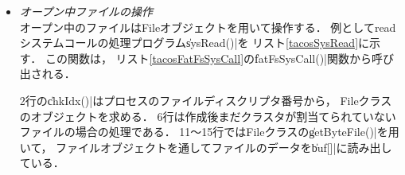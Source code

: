 \begin{itemize}
  2行はクライアントプロセスのPCB中に，
  ファイルディスクリプタを記録する場所を確保している\footnote{
    プロセス終了時にファイルを自動的にクローズるために，
    プロセス（PCB）に記録を残す必要がある．}．
  4行はfatSysクラスの\|files|配列に場所を確保している．
  7行で前出の\|srchPath()|関数を用いて\|path|を最後まで解析し，
  目的ファイルのディレクトリエントリを探す．
  見つからない場合はエラーになる\footnote{
    TacOSのopenシステムコールにはファイルの作成機能は無い．
    ファイルの作成はcreatシステムコールで行う．}．
  12行でディレクトリファイルの「読み出しオープン」を可能にしている．
  
  14〜18行ではFileオブジェクトとセクタを格納するバッファを生成している．
  \|malloc()|，\|free()|関数は，
  メモリマネージャサーバのシステムコールを呼び出すスタブルーチンである．

  

  20〜29行ではFileオブジェクトを初期化している．
  21行ではオープンファイルが
  ディレクトリファイルであることを表すブラグをセットしている．
  26〜27行ではオープンファイルが格納されている
  ディレクトリエントリを記録している\footnote{
    FATファイルシステムでは
    ファイルサイズなどをディレクトリエントリに記録しているので，
    ファイルをオープン後もディレクトリエントリにアクセスする必要がある．}．
  
  33行，35行ではFileオブジェクトを引数に，
  fileクラスの\|seekFile()|関数を使用してる．
  {\cmml}で，fileクラスのような複数のインスタンスを持つクラスを操作する場合，
  インスタンスを引数にクラスの関数を呼び出す．

\item \emph{オープン中ファイルの操作} \\
  オープン中のファイルはFileオブジェクトを用いて操作する．
  例としてreadシステムコールの処理プログラム\|sysRead()|を
  リスト\ref{tacosSysRead}に示す．
  この関数は，
  リスト\ref{tacosFatFsSysCall}の\|fatFsSysCall()|関数から呼び出される．

  

  2行の\|chkIdx()|はプロセスのファイルディスクリプタ番号から，
  Fileクラスのオブジェクトを求める．
  6行は作成後まだクラスタが割当てられていないファイルの場合の処理である．
  11〜15行ではFileクラスの\|getByteFile()|を用いて，
  ファイルオブジェクトを通してファイルのデータを\|buf[]|に読み出している．


\end{itemize}
